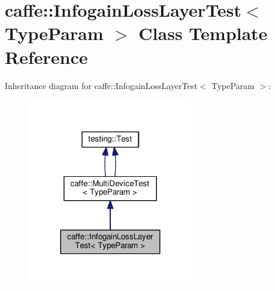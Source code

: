 \hypertarget{classcaffe_1_1_infogain_loss_layer_test}{}\section{caffe\+:\+:Infogain\+Loss\+Layer\+Test$<$ Type\+Param $>$ Class Template Reference}
\label{classcaffe_1_1_infogain_loss_layer_test}


Inheritance diagram for caffe\+:\+:Infogain\+Loss\+Layer\+Test$<$ Type\+Param $>$\+:
\nopagebreak
\begin{figure}[H]
\begin{center}
\leavevmode
\includegraphics[width=204pt]{classcaffe_1_1_infogain_loss_layer_test__inherit__graph}
\end{center}
\end{figure}
